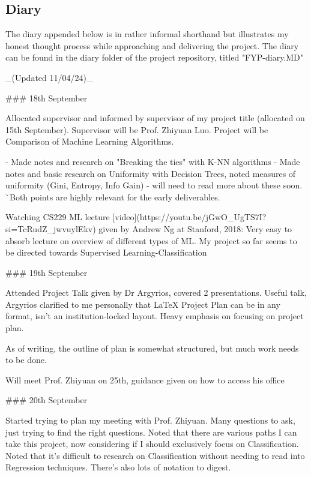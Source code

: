 \documentclass[letterpaper,10pt]{article}
\begin{document}
\subsection{Diary}
The diary appended below is in rather informal shorthand but illustrates my honest thought process while approaching and delivering the project. The diary can be found in the diary folder of the project repository, titled "FYP-diary.MD"
\begin{markdown}


_(Updated 11/04/24)_

### 18th September 

Allocated supervisor and informed by supervisor of my project title (allocated on 15th September). Supervisor will be Prof. Zhiyuan Luo.
Project will be Comparison of Machine Learning Algorithms.

- Made notes and research on "Breaking the ties" with K-NN algorithms
- Made notes and basic research on Uniformity with Decision Trees, noted measures of uniformity (Gini, Entropy, Info Gain) - will need to read more about these soon.
^^ Both points are highly relevant for the early deliverables.

Watching CS229 ML lecture [video](https://youtu.be/jGwO_UgTS7I?si=TcRudZ_jwvuylEkv) given by Andrew Ng at Stanford, 2018: 
Very easy to absorb lecture on overview of different types of ML. My project so far seems to be directed towards Supervised Learning-Classification



### 19th September

Attended Project Talk given by Dr Argyrios, covered 2 presentations. Useful talk, Argyrios clarified to me personally that LaTeX Project Plan can be in any format, isn't an institution-locked layout.
Heavy emphasis on focusing on project plan.

As of writing, the outline of plan is somewhat structured, but much work needs to be done.

Will meet Prof. Zhiyuan on 25th, guidance given on how to access his office

### 20th September

Started trying to plan my meeting with Prof. Zhiyuan. Many questions to ask, just trying to find the right questions. Noted that there are various paths I can take this project, now considering if I should exclusively focus on Classification.
Noted that it's difficult to research on Classification without needing to read into Regression techniques. There's also lots of notation to digest.


\end{markdown}
\end{document}
